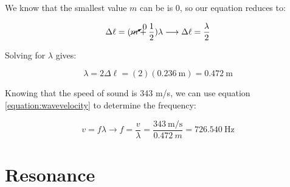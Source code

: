 \begin{mdframed}[backgroundcolor=blue!10!white]
		We know that the smallest value $m$ can be is 0, so our equation reduces to:
				
		\begin{equation*}
		\Delta \ell = (\cancelto{0}{m}+\frac{1}{2}) \lambda \longrightarrow \Delta \ell = \frac{\lambda}{2}
		\end{equation*}
		
		


		Solving for $\lambda$ gives:
		
		
		\begin{equation*}
		\lambda = 2 \Delta \ell = (2)(\SI{0.236}{\m}) = \SI{0.472}{\m}
		\end{equation*}
		
	
		Knowing that the speed of sound is 343 m/s, we can use equation \ref{equation:wavevelocity} to determine the frequency:
		
		\begin{equation*}
		v = f \lambda \longrightarrow f = \frac{v}{\lambda} = \frac{\SI[per-mode = symbol]{343}{\m\per\s}}{\SI{0.472}{m}} = \boxed{\SI{726.540}{\Hz}} 
		\end{equation*}
		

		 
	
		
	\end{mdframed}
	
	
	\section{Resonance}
	
	
	
	

	
	
	

	

	


